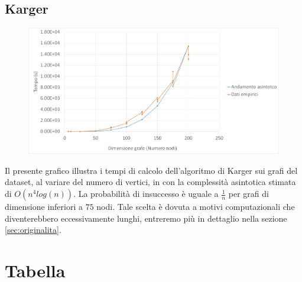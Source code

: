 \subsection{Karger\label{sec:karger}}
\begin{figure}[htp]
    \centering
    \includegraphics[width=\textwidth]{immagini/karger.jpg}
\end{figure}
Il presente grafico illustra i tempi di calcolo dell'algoritmo di Karger sui grafi del dataset, al variare del numero di vertici, in con la complessità asintotica stimata di \(O(n^{4}log(n))\). La probabilità di insuccesso è uguale a \(\frac{1}{n}\) per grafi di dimensione inferiori a $75$ nodi. Tale scelta è dovuta a motivi computazionali che diventerebbero eccessivamente lunghi, entreremo più in dettaglio nella sezione \vref{sec:originalita}. 


\section{Tabella\label{sec:tabella}}

